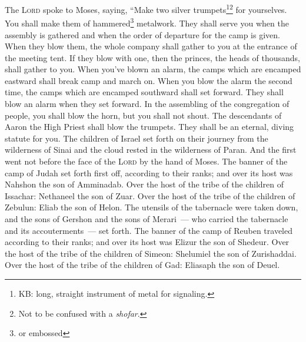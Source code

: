 
\begin{enumerate*}[mode=unboxed]
     The \textsc{Lord} spoke to Moses, saying,%
     ``Make two silver trumpets\footnote{KB: long, straight instrument of metal for signaling.}\footnote{Not to be confused with a \textit{shofar}.} for yourselves. You shall make them of hammered\footnote{or embossed} metalwork. They shall serve you when the assembly is gathered and when the order of departure for the camp is given.%
     When they blow them, the whole company shall gather to you at the entrance of the meeting tent.%
     If they blow with one, then the princes, the heads of thousands, shall gather to you.%
     When you've blown an alarm, the camps which are encamped eastward shall break camp and march on.%
     When you blow the alarm the second time, the camps which are encamped southward shall set forward. They shall blow an alarm when they set forward.%
     In the assembling of the congregation of people, you shall blow the horn, but you shall not shout.%
     The descendants of Aaron the High Priest shall blow the trumpets. They shall be an eternal, diving statute for you.%
     The children of Israel set forth on their journey from the wilderness of Sinai and the cloud rested in the wilderness of Paran.%
     And the first went not before the face of the \textsc{Lord} by the hand of Moses.%
     The banner of the camp of Judah set forth first off, according to their ranks; and over its host was Nahshon the son of Amminadab.%
     Over the host of the tribe of the children of Issachar: Nethaneel the son of Zuar.%
     Over the host of the tribe of the children of Zebulun: Eliab the son of Helon.%
     The utensils of the tabernacle were taken down, and the sons of Gershon and the sons of Merari~--- who carried the tabernacle and its accouterments~--- set forth.%
     The banner of the camp of Reuben traveled according to their ranks; and over its host was Elizur the son of Shedeur.%
     Over the host of the tribe of the children of Simeon: Shelumiel the son of Zurishaddai.%
     Over the host of the tribe of the children of Gad: Eliasaph the son of Deuel.%

\end{enumerate*}
